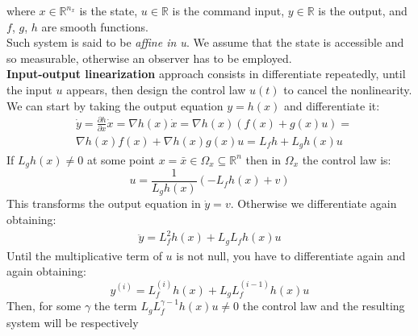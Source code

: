 where $x\in\mathbb{R}^{n_x}$ is the state, $u\in\mathbb{R}$ is the command input, $y\in\mathbb{R}$ is the output, and $f$, $g$, $h$ are smooth functions.\\
Such system is said to be \textit{affine in u}. We assume that the state is accessible and so measurable, otherwise an observer has to be employed. \\
\textbf{Input-output linearization} approach consists in differentiate repeatedly, until the input $u$ appears, then design the control law $u(t)$ to cancel the nonlinearity.\\
We can start by taking the output equation $y=h(x)$ and differentiate it: 
\begin{align}
    &\dot{y}=\frac{\partial h}{\partial x}\dot{x}=\nabla h(x)\dot{x}=
    \nabla h(x) (f(x)+g(x)u) = \\
    &\nabla h(x) f(x) + \nabla h(x) g(x) u=
    L_fh+L_gh(x)u
\end{align}
If $L_gh(x) \ne 0$ at some point $x=\bar{x}\in \Omega_x\subseteq\mathbb{R}^n$ then in $\Omega_x$ the control law is: 
\begin{equation}
    u=\frac{1}{L_gh(x)} (-L_fh(x)+v)
\end{equation}
This transforms the output equation in $\dot{y}=v$. Otherwise we differentiate again obtaining: 
\begin{align}
    \ddot{y}=L_f^2h(x)+L_gL_fh(x)u
\end{align}
Until the multiplicative term of $u$ is not null, you have to differentiate again and again obtaining:
\begin{equation}
    y^{(i)}=L_f^{(i)}h(x)+L_gL_f^{(i-1)}h(x)u
\end{equation}
Then, for some $\gamma$ the term $L_gL_f^{\gamma-1}h(x)u \ne 0$ the control law and the resulting system will be respectively\\


\hspace*{-5mm}
%


